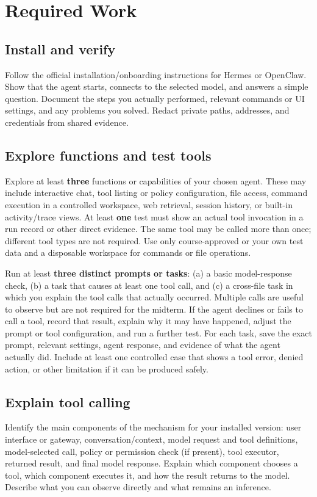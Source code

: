 \documentclass[11pt]{article}
\begin{document}
\section{Required Work}
\subsection{Install and verify}
Follow the official installation/onboarding instructions for Hermes or OpenClaw. Show that the agent starts, connects to the selected model, and answers a simple question. Document the steps you actually performed, relevant commands or UI settings, and any problems you solved. Redact private paths, addresses, and credentials from shared evidence.

\subsection{Explore functions and test tools}
Explore at least \textbf{three} functions or capabilities of your chosen agent. These may include interactive chat, tool listing or policy configuration, file access, command execution in a controlled workspace, web retrieval, session history, or built-in activity/trace views. At least \textbf{one} test must show an actual tool invocation in a run record or other direct evidence. The same tool may be called more than once; different tool types are not required. Use only course-approved or your own test data and a disposable workspace for commands or file operations.

Run at least \textbf{three distinct prompts or tasks}: (a) a basic model-response check, (b) a task that causes at least one tool call, and (c) a cross-file task in which you explain the tool calls that actually occurred. Multiple calls are useful to observe but are not required for the midterm. If the agent declines or fails to call a tool, record that result, explain why it may have happened, adjust the prompt or tool configuration, and run a further test. For each task, save the exact prompt, relevant settings, agent response, and evidence of what the agent actually did. Include at least one controlled case that shows a tool error, denied action, or other limitation if it can be produced safely.

\subsection{Explain tool calling}
Identify the main components of the mechanism for your installed version: user interface or gateway, conversation/context, model request and tool definitions, model-selected call, policy or permission check (if present), tool executor, returned result, and final model response. Explain which component chooses a tool, which component executes it, and how the result returns to the model. Describe what you can observe directly and what remains an inference.
\end{document}
